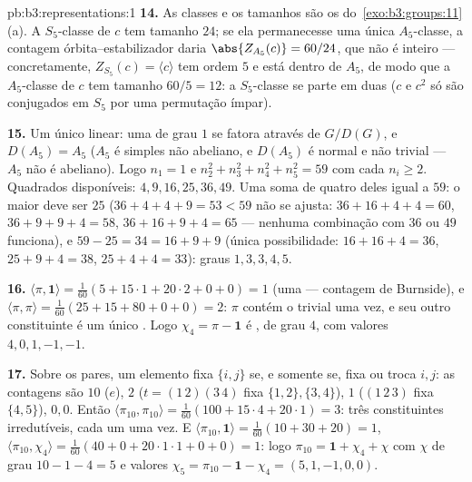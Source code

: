 \begin{solution}{pb:b3:representations:1}
\textbf{14.} As classes e os tamanhos são os do~\cref{exo:b3:groups:11}(a). A
$S_5$-classe de $c$ tem tamanho
$24$; se ela permanecesse uma única $A_5$-classe, a contagem
órbita--estabilizador daria $\abs{Z_{A_5}(c)} = 60/24$, que não é inteiro ---
concretamente, $Z_{S_5}(c) = \langle c\rangle$ tem ordem $5$ e
está dentro de $A_5$, de modo que a $A_5$-classe de $c$ tem tamanho $60/5 =
12$: a $S_5$-classe se parte em duas ($c$ e $c^2$ só são conjugados
em $S_5$ por uma permutação ímpar).

\textbf{15.} Um único  linear: uma  de grau $1$
se fatora através de $G/D(G)$, e $D(A_5) = A_5$ ($A_5$ é simples
não abeliano, e $D(A_5)$ é normal e não trivial ---
$A_5$ não é abeliano). Logo $n_1 = 1$ e $n_2^2 + n_3^2 + n_4^2
+ n_5^2 = 59$ com cada $n_i \geq 2$. Quadrados disponíveis: $4, 9,
16, 25, 36, 49$. Uma soma de quatro deles igual a $59$: o
maior deve ser $25$ ($36 + 4 + 4 + 9 = 53 < 59$ não se
ajusta: $36 + 16 + 4 + 4 = 60$, $36 + 9 + 9 + 4 = 58$, $36 +
16 + 9 + 4 = 65$ --- nenhuma combinação com $36$ ou $49$ funciona),
e $59 - 25 = 34 = 16 + 9 + 9$ (única possibilidade: $16 + 16 + 4 =
36$, $25 + 9 + 4 = 38$, $25 + 4 + 4 = 33$): graus $1, 3, 3,
4, 5$.

\textbf{16.} $\langle\pi, \mathbf 1\rangle = \frac1{60}(5 +
15\cdot1 + 20\cdot2 + 0 + 0) = 1$ (uma  --- contagem de
Burnside), e $\langle\pi, \pi\rangle = \frac1{60}(25 + 15 + 80 +
0 + 0) = 2$: $\pi$ contém o  trivial uma vez, e seu
outro constituinte é um único . Logo $\chi_4 = \pi
- \mathbf 1$ é , de grau $4$, com valores $4, 0,
1, -1, -1$.

\textbf{17.} Sobre os pares, um elemento fixa $\{i,j\}$ se, e somente se, fixa
ou troca $i, j$: as contagens são $10$ ($e$), $2$ ($t =
(1\,2)(3\,4)$ fixa $\{1,2\}, \{3,4\}$), $1$ ($(1\,2\,3)$
fixa $\{4,5\}$), $0, 0$. Então $\langle\pi_{10},
\pi_{10}\rangle = \frac1{60}(100 + 15\cdot4 + 20\cdot1) = 3$:
três constituintes irredutíveis, cada um uma vez. E
$\langle\pi_{10}, \mathbf 1\rangle = \frac1{60}(10 + 30 + 20)
= 1$, $\langle\pi_{10}, \chi_4\rangle = \frac1{60}(40 + 0 +
20\cdot1\cdot1 + 0 + 0) = 1$: logo $\pi_{10} = \mathbf 1 + \chi_4
+ \chi$ com $\chi$  de grau $10 - 1 - 4 = 5$ e
valores $\chi_5 = \pi_{10} - \mathbf 1 - \chi_4 = (5, 1, -1, 0,
0)$.


\end{solution}
